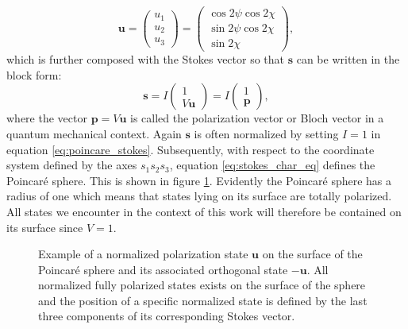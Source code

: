 \begin{equation}
    \bm{u}=
    \begin{pmatrix}
    u_1 \\
    u_2 \\
    u_3
    \end{pmatrix}
    =
    \begin{pmatrix}
    \cos 2\psi \cos 2\chi \\
    \sin 2\psi \cos 2\chi \\
    \sin 2\chi
    \end{pmatrix},
\end{equation}
which is further composed with the Stokes vector so that $\bm{s}$ can be written in the block form: %
\begin{equation}
    \label{eq:poincare_stokes}
    \bm{s}=I
    \begin{pmatrix}
    1 \\
    V \bm{u}
    \end{pmatrix}
    =I
    \begin{pmatrix}
    1 \\
    \bm{p}
    \end{pmatrix},
\end{equation}
where the vector $\bm{p}=V\bm{u}$ is called the polarization vector or Bloch vector in a quantum mechanical context. Again $\bm{s}$ is often normalized by setting $I=1$ in equation \ref{eq:poincare_stokes}. Subsequently, with respect to the coordinate system defined by the axes $s_1s_2s_3$, equation \ref{eq:stokes_char_eq} defines the Poincaré sphere. This is shown in figure \ref{fig:poincare_sphere_intro}. Evidently the Poincaré sphere has a radius of one which means that states lying on its surface are totally polarized. All states we encounter in the context of this work will therefore be contained on its surface since $V=1$.

\begin{figure}[h]
    \centering
    
    \caption{Example of a normalized polarization state $\bm{u}$ on the surface of the Poincaré sphere and its associated orthogonal state $-\bm{u}$. All normalized fully polarized states exists on the surface of the sphere and the position of a specific normalized state is defined by the last three components of its corresponding Stokes vector.}
    \label{fig:poincare_sphere_intro}
\end{figure}

